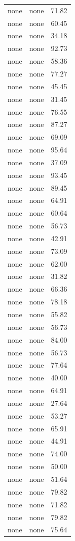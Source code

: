\begin{tabular}{rrr}
none & none & 71.82 \\
none & none & 60.45 \\
none & none & 34.18 \\
none & none & 92.73 \\
none & none & 58.36 \\
none & none & 77.27 \\
none & none & 45.45 \\
none & none & 31.45 \\
none & none & 76.55 \\
none & none & 87.27 \\
none & none & 69.09 \\
none & none & 95.64 \\
none & none & 37.09 \\
none & none & 93.45 \\
none & none & 89.45 \\
none & none & 64.91 \\
none & none & 60.64 \\
none & none & 56.73 \\
none & none & 42.91 \\
none & none & 73.09 \\
none & none & 62.00 \\
none & none & 31.82 \\
none & none & 66.36 \\
none & none & 78.18 \\
none & none & 55.82 \\
none & none & 56.73 \\
none & none & 84.00 \\
none & none & 56.73 \\
none & none & 77.64 \\
none & none & 40.00 \\
none & none & 64.91 \\
none & none & 27.64 \\
none & none & 53.27 \\
none & none & 65.91 \\
none & none & 44.91 \\
none & none & 74.00 \\
none & none & 50.00 \\
none & none & 51.64 \\
none & none & 79.82 \\
none & none & 71.82 \\
none & none & 79.82 \\
none & none & 75.64 \\

\end{tabular}
